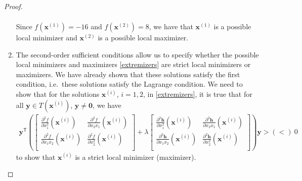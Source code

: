 \documentclass[12pt]{article}
\theoremstyle{definition}
\newcommand{\vc}[1]{\boldsymbol{#1}}
\newcommand{\tran}{\mathsf{T}}
\begin{document}
\begin{proof}
\begin{enumerate}
\begin{align}
      \end{align}
      Since $f(\vc{x}^{(1)}) = -16$ and $f(\vc{x}^{(2)}) = 8$, we have that $\vc{x}^{(1)}$ is a possible local
      minimizer and $\vc{x}^{(2)}$ is a possible local maximizer.
    \item The second-order sufficient conditions allow us to specify whether
      the possible local minimizers and maximizers \eqref{extremizers} are strict local minimizers or maximizers.
      We have already shown that these solutions satisfy the first condition, i.e.\ these solutions satisfy the Lagrange condition.
      We need to show that for the solutions $\vc{x}^{(i)}$, $i=1,2$, in \eqref{extremizers}, it is true that
      for all $\vc{y} \in T(\vc{x}^{(i)})$, $\vc{y}\neq \vc{0}$, we have
      \begin{align*}
        \vc{y}^\tran \left(
          \begin{bmatrix}
            \frac{\partial^2 f}{\partial x_1^2}(\vc{x}^{(i)}) & \frac{\partial^2 f}{\partial x_2x_1}(\vc{x}^{(i)}) \\
            \frac{\partial^2 f}{\partial x_1x_2}(\vc{x}^{(i)}) & \frac{\partial^2 f}{\partial x_2^2}(\vc{x}^{(i)}) \\
          \end{bmatrix} + \lambda
          \begin{bmatrix}
            \frac{\partial^2 \vc{h}}{\partial x_1^2}(\vc{x}^{(i)}) & \frac{\partial^2 \vc{h}}{\partial x_2x_1}(\vc{x}^{(i)}) \\
            \frac{\partial^2 \vc{h}}{\partial x_1x_2}(\vc{x}^{(i)}) & \frac{\partial^2 \vc{h}}{\partial x_2^2}(\vc{x}^{(i)}) \\
          \end{bmatrix}
        \right) \vc{y} > (<)\ 0
      \end{align*}
      to show that $\vc{x}^{(i)}$ is a strict local minimizer (maximizer).


\end{enumerate}
\end{proof}
\end{document}

